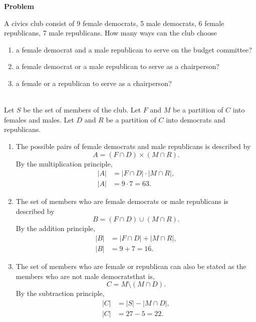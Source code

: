 \documentclass[12pt]{article}
\newcounter{problem}[section]
\newenvironment{problem}[1][]
{\refstepcounter{problem}\noindent\textbf{Problem~\theproblem #1}\vspace{0.2cm}\\\begin{lrbox}{\mybox}\begin{minipage}{\textwidth}}
{\end{minipage}\end{lrbox}\fbox{\usebox{\mybox}}}
\newenvironment{solution}{\vspace{0.1cm}\\}{\vspace{0.5cm}}
\begin{document}
\begin{problem}
    A civics club consist of 9 female democrats, 5 male democrats, 6 female republicans, 7 male republicans. How many ways can the club choose
    \begin{enumerate}[label=(\emph{\alph*})]
        \item a female democrat and a male republican to serve on the budget committee?
        \item a female democrat or a male republican to serve as a chairperson?
        \item a female or a republican to serve as a chairperson?
    \end{enumerate}
\end{problem}
\begin{solution}
    Let $S$ be the set of members of the club. Let $F$ and $M$ be a partition of $C$ into females and males. Let $D$ and $R$ be a partition of $C$ into democrats and republicans. 
    \begin{enumerate}[label=(\emph{\alph*})]
        \item The possible pairs of female democrats and male republicans is described by
        \[A = (F\cap D)\times(M\cap R).\]
        By the multiplication principle,
        \begin{align*}
            |A| &= |F\cap D|\cdot|M\cap R|, \\
            |A| &= 9\cdot7 = 63.
        \end{align*}
        
        \item The set of members who are female democrats or male republicans is described by
        \[B = (F\cap D) \cup (M\cap R).\]
        By the addition principle,
        \begin{align*}
            |B| &= |F\cap D| + |M \cap R|, \\
            |B| &= 9 + 7 = 16.
        \end{align*}
        
        \item The set of members who are female or republican can also be stated as the members who are not male democrats\textemdash that is,
        \[C = M\setminus(M\cap D).\]
        By the subtraction principle,
        \begin{align*}
            |C| &= |S| - |M\cap D|, \\
            |C| &= 27 - 5 = 22.
        \end{align*}
    \end{enumerate}
\end{solution}
\end{document}
